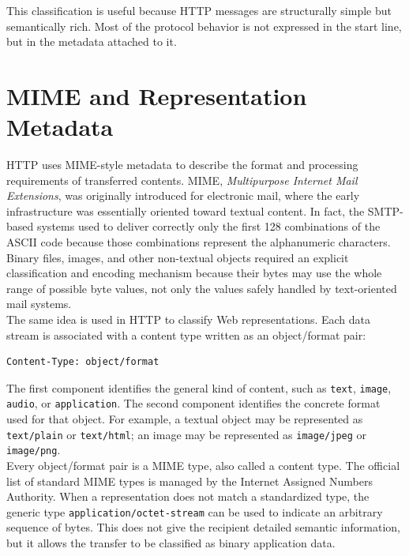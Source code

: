 \documentclass{scrbook}
\begin{document}
This classification is useful because HTTP messages are structurally simple but semantically rich. Most of the protocol behavior is not expressed in the start line, but in the metadata attached to it.

\section{MIME and Representation Metadata}

HTTP uses MIME-style metadata to describe the format and processing requirements of transferred contents. MIME, \emph{Multipurpose Internet Mail Extensions}, was originally introduced for electronic mail, where the early infrastructure was essentially oriented toward textual content. In fact, the SMTP-based systems used to deliver correctly only the first 128 combinations of the ASCII code because those combinations represent the alphanumeric characters. Binary files, images, and other non-textual objects required an explicit classification and encoding mechanism because their bytes may use the whole range of possible byte values, not only the values safely handled by text-oriented mail systems.\\

The same idea is used in HTTP to classify Web representations. Each data stream is associated with a content type written as an object/format pair:

\begin{lstlisting}
Content-Type: object/format
\end{lstlisting}

The first component identifies the general kind of content, such as \texttt{text}, \texttt{image}, \texttt{audio}, or \texttt{application}. The second component identifies the concrete format used for that object. For example, a textual object may be represented as \texttt{text/plain} or \texttt{text/html}; an image may be represented as \texttt{image/jpeg} or \texttt{image/png}.\\

Every object/format pair is a MIME type, also called a content type. The official list of standard MIME types is managed by the Internet Assigned Numbers Authority. When a representation does not match a standardized type, the generic type \texttt{application/octet-stream} can be used to indicate an arbitrary sequence of bytes. This does not give the recipient detailed semantic information, but it allows the transfer to be classified as binary application data.
\end{document}
